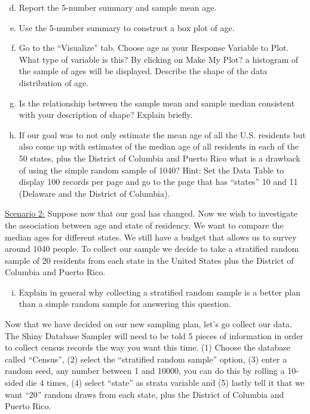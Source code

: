 \documentclass{article}\usepackage[]{graphicx}\usepackage[]{color}
\begin{document}
\begin{enumerate}[(a)]
\setcounter{enumi}{3}
\item Report the 5-number summary and sample mean age.
\item	Use the 5-number summary to construct a box plot of age.
\item	Go to the ``Visualize'' tab.  Choose age as your Response Variable to Plot.  What type of variable is this?  By clicking on Make My Plot? a histogram of the sample of ages will be displayed.  Describe the shape of the data distribution of age.
\item	Is the relationship between the sample mean and sample median consistent with your description of shape?  Explain briefly.
\item	If our goal was to not only estimate the mean age of all the U.S. residents but also come up with estimates of the median age of all residents in each of the 50 states, plus the District of Columbia and Puerto Rico what is a drawback of using the simple random sample of 1040?  Hint: Set the Data Table to display 100 records per page and go to the page that has ``states'' 10 and 11 (Delaware and the District of Columbia).
\end{enumerate}

\underline{Scenario 2:} Suppose now that our goal has changed.  Now we wish to investigate the association between age and state of residency. We want to compare the median ages for different states. We still have a budget that allows us to survey around 1040 people. To collect our sample we decide to take a stratified random sample of 20 residents from each state in the United States plus the District of Columbia and Puerto Rico. 

\begin{enumerate}[(a)]
\setcounter{enumi}{8}
\item  Explain in general why collecting a stratified random sample is a better plan than a simple random sample for answering this question.  
\end{enumerate}

Now that we have decided on our new sampling plan, let's go collect our data.  The Shiny Database Sampler will need to be told 5 pieces of information in order to collect census records the way you want this time. (1) Choose the database called ``Census'', (2) select the ``stratified random sample'' option, (3) enter a random seed, any number between 1 and 10000, you can do this by rolling a 10-sided die 4 times, (4) select ``state'' as strata variable and (5) lastly tell it that we want ``20'' random draws from each state, plus the District of Columbia and Puerto Rico.  \\
\end{document}
